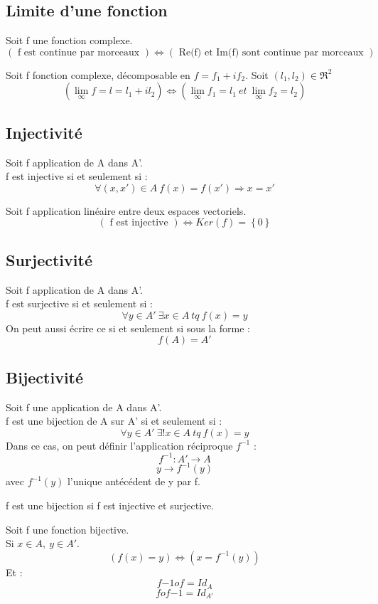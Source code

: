 \subsection{Limite d'une fonction}
\begin{prop}
Soit f une fonction complexe.
$$(\mbox{ f est continue par morceaux }) \Leftrightarrow (\mbox{ Re(f) et Im(f) sont continue par morceaux })$$
\end{prop}
\begin{prop}
Soit f fonction complexe, décomposable en $f = f_1 + if_2$. Soit $(l_1,l_2) \in \Re^2$
$$(\lim_{\infty} f = l=l_1+i l_2) \Leftrightarrow (\lim_{\infty} f_1 = l_1~ et~ \lim_{\infty} f_2 = l_2)$$
\end{prop}
\subsection{Injectivité}
\begin{de}
Soit f application de A dans A'.\\
f est injective si et seulement si :
$$\forall(x,x')\in A~ f(x)=f(x') \Rightarrow x=x'$$
\end{de}
\begin{prop}
Soit f application linéaire entre deux espaces vectoriels.
$$(\mbox{ f est injective }) \Leftrightarrow Ker(f) = \left\lbrace 0 \right\rbrace $$
\end{prop}
\subsection{Surjectivité}
\begin{de}
Soit f application de A dans A'.\\
f est surjective si et seulement si :
$$\forall y \in A'~ \exists x \in A~ tq~ f(x)=y$$
On peut aussi écrire ce si et seulement si sous la forme : 
$$f(A) = A'$$
\end{de}
\subsection{Bijectivité}
\begin{de}
Soit f une application de A dans A'.\\
f est une bijection de A sur A' si et seulement si :
$$\forall y \in A'~ \exists!x\in A~ tq~ f(x)=y$$
Dans ce cas, on peut définir l'application réciproque $f^{-1}$ :
$$f^{-1} : A' \rightarrow A$$
$$y \rightarrow f^{-1}(y)$$
avec $f^{-1}(y)$ l'unique antécédent de y par f.
\end{de}
\begin{prop}
f est une bijection si f est injective et surjective.
\end{prop}
\begin{prop}
Soit f une fonction bijective.\\
Si $x \in A,~ y\in A'$.\\
$$(f(x) = y) \Leftrightarrow (x = f^{-1}(y))$$
Et : 
$$f{-1}of = Id_A$$
$$fof{-1} = Id_{A'}$$
\end{prop}
